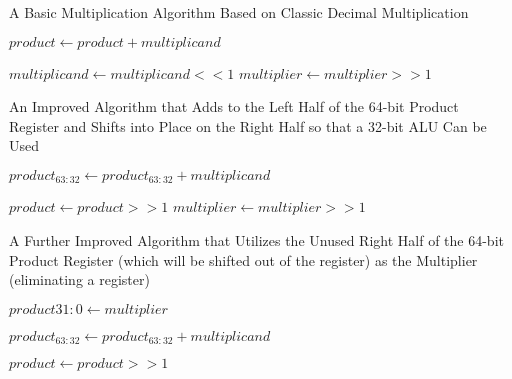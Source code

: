 \documentclass[11pt]{article}
\begin{document}
\begin{algorithm}[hbt!]
\caption{A Basic Multiplication Algorithm Based on Classic Decimal Multiplication}\label{alg:mul1}
\begin{algorithmic}

        \State $product \gets product + multiplicand$    
    \EndIf
    
    \State $multiplicand \gets multiplicand << 1$
    \State $multiplier \gets multiplier >> 1$
\EndFor 

\end{algorithmic}
\end{algorithm}

\pagebreak

\begin{algorithm}[hbt!]
\caption{An Improved Algorithm that Adds to the Left Half of the 64-bit Product Register and Shifts into Place on the Right Half so that a 32-bit ALU Can be Used}\label{alg:mul2}
\begin{algorithmic}

        \State $product_{63:32} \gets product_{63:32} + multiplicand$    
    \EndIf
    
    \State $product \gets product >> 1$
    \State $multiplier \gets multiplier >> 1$
\EndFor 

\end{algorithmic}
\end{algorithm}

\pagebreak

\begin{algorithm}[hbt!]
\caption{A Further Improved Algorithm that Utilizes the Unused Right Half of the 64-bit Product Register (which will be shifted out of the register) as the Multiplier (eliminating a register)}\label{alg:mul3}
\begin{algorithmic}

\State $product{31:0} \gets multiplier$

        \State $product_{63:32} \gets product_{63:32} + multiplicand$    
    \EndIf
    
    \State $product \gets product >> 1$
\EndFor 

\end{algorithmic}
\end{algorithm}

\pagebreak
\end{document}

